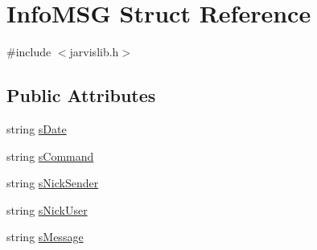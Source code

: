 \hypertarget{struct_info_m_s_g}{\section{Info\-M\-S\-G Struct Reference}
\label{struct_info_m_s_g}
}


{\ttfamily \#include $<$jarvislib.\-h$>$}

\subsection*{Public Attributes}
\begin{DoxyCompactItemize}
\item 
string \hyperlink{struct_info_m_s_g_a3b29ec965475b758cc2cb22b026eec7c}{s\-Date}
\item 
string \hyperlink{struct_info_m_s_g_a3adfa3ded4ee9cb940cb63207c8f189d}{s\-Command}
\item 
string \hyperlink{struct_info_m_s_g_a1a22a3365033e07b4a8582c44a64ea69}{s\-Nick\-Sender}
\item 
string \hyperlink{struct_info_m_s_g_af69f3f03d86d855c35d191c62bdbc3bc}{s\-Nick\-User}
\item 
string \hyperlink{struct_info_m_s_g_a8faf1f1c68cbabd49753b7ef8c3f0a42}{s\-Message}
\end{DoxyCompactItemize}


